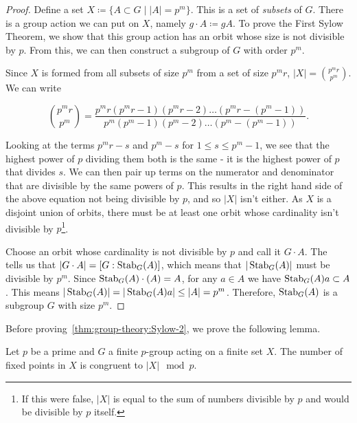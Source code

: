 \begin{proof}
  Define a set \(X \coloneqq \{ A \subset G \mid |A| = p^{m}\}\). This is a set of \textit{subsets} of \(G\). There is a group action we can put on \(X\), namely \(g \cdot A \coloneqq gA\). To prove the First Sylow Theorem, we show that this group action has an orbit whose size is not divisible by \(p\). From this, we can then construct a subgroup of \(G\) with order \(p^{m}\).

  Since \(X\) is formed from all subsets of size \(p^{m}\) from a set of size \(p^{m} r\), \(|X| = {p^{m}r \choose p^{m}}\). We can write

  \[{p^{m}r \choose p^{m}} = \frac{p^{m}r(p^{m}r-1)(p^{m}r -2) \ldots (p^{m}r - (p^{m}-1))}{p^{m}(p^{m} - 1)(p^{m} - 2)\ldots(p^{m} - (p^{m} - 1))}.\]

  Looking at the terms \(p^{m}r - s\) and \(p^{m} - s\) for \(1 \leq s \leq p^{m}-1\), we see that the highest power of \(p\) dividing them both is the same - it is the highest power of \(p\) that divides \(s\). We can then pair up terms on the numerator and denominator that are divisible by the same powers of \(p\). This results in the right hand side of the above equation not being divisible by \(p\), and so \(|X|\) isn't either. As \(X\) is a disjoint union of orbits, there must be at least one orbit whose cardinality isn't divisible by \(p\)\footnote{If this were false, \(|X|\) is equal to the sum of numbers divisible by \(p\) and would be divisible by \(p\) itself.}.

  Choose an orbit whose cardinality is not divisible by \(p\) and call it \(G \cdot A\). The~ tells us that \(|G \cdot A| = [G : \operatorname{Stab}_{G}(A)]\), which means that \(|\operatorname{Stab}_{G}(A)|\) must be divisible by \(p^{m}\). Since \(\operatorname{Stab}_{G}(A) \cdot (A) = A\), for any \(a \in A\) we have \(\operatorname{Stab}_{G}(A)a \subset A\). This means \(|\operatorname{Stab}_{G}(A)| = |\operatorname{Stab}_{G}(A)a| \leq |A| = p^{m}\). Therefore, \(\operatorname{Stab}_{G}(A)\) is a subgroup \(G\) with size \(p^{m}\).
\end{proof}


Before proving~\ref{thm:group-theory:Sylow-2}, we prove the following lemma.

\begin{lemma}\label{lem:group-theory:fixed-points-p-group-action}
  Let \(p\) be a prime and \(G\) a finite \(p\)-group acting on a finite set \(X\). The number of fixed points in \(X\) is congruent to \(|X| \mod p\).
\end{lemma}

